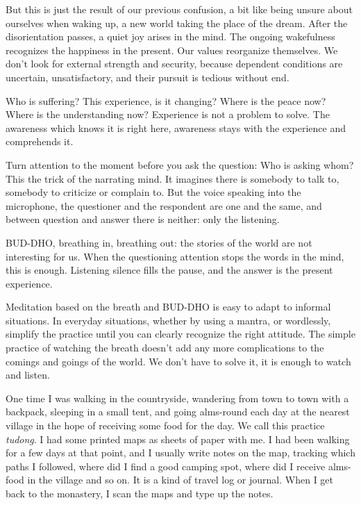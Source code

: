 But this is just the result of our previous confusion, a bit like being
unsure about ourselves when waking up, a new world taking the place of
the dream. After the disorientation passes, a quiet joy arises in the
mind. The ongoing wakefulness recognizes the happiness in the present.
Our values reorganize themselves. We don't look for external strength
and security, because dependent conditions are uncertain,
unsatisfactory, and their pursuit is tedious without end.

Who is suffering? This experience, is it changing? Where is the peace
now? Where is the understanding now? Experience is not a problem to
solve. The awareness which knows it is right here, awareness stays with
the experience and comprehends it.

\enlargethispage*{2\baselineskip}

Turn attention to the moment before you ask the question: Who is asking
whom? This the trick of the narrating mind. It imagines there is
somebody to talk to, somebody to criticize or complain to. But the voice
speaking into the microphone, the questioner and the respondent are one
and the same, and between question and answer there is neither: only the
listening.

\clearpage


BUD-DHO, breathing in, breathing out: the stories of the world are not
interesting for us. When the questioning attention stops the words in
the mind, this is enough. Listening silence fills the pause, and the
answer is the present experience.

Meditation based on the breath and BUD-DHO is easy to adapt to informal
situations. In everyday situations, whether by using a mantra, or
wordlessly, simplify the practice until you can clearly recognize the
right attitude. The simple practice of watching the breath doesn't add
any more complications to the comings and goings of the world. We don't
have to solve it, it is enough to watch and listen.


One time I was walking in the countryside, wandering from town to town
with a backpack, sleeping in a small tent, and going alms-round each day
at the nearest village in the hope of receiving some food for the day.
We call this practice \emph{tudong}. I had some printed maps as sheets
of paper with me. I had been walking for a few days at that point, and I
usually write notes on the map, tracking which paths I followed, where
did I find a good camping spot, where did I receive alms-food in the
village and so on. It is a kind of travel log or journal. When I get
back to the monastery, I scan the maps and type up the notes.

